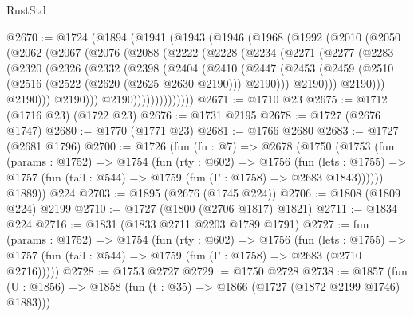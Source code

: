 \begin{lexlean}{RustStd}
\begin{coremodule}
@2670 := @1724
    (@1894
      (@1941
        (@1943
          (@1946
            (@1968
              (@1992
                (@2010
                  (@2050
                    (@2062
                      (@2067
                        (@2076
                          (@2088
                            (@2222
                              (@2228
                                (@2234
                                  (@2271
                                    (@2277
                                      (@2283
                                        (@2320
                                          (@2326
                                            (@2332
                                              (@2398
                                                (@2404
                                                  (@2410
                                                    (@2447
                                                      (@2453
                                                        (@2459
                                                          (@2510
                                                            (@2516
                                                              (@2522 (@2620 (@2625 @2630 @2190)))
                                                              @2190)))
                                                        @2190)))
                                                  @2190)))
                                            @2190)))
                                      @2190)))
                                @2190))))))))))))))
@2671 := @1710 @23
@2675 := @1712 (@1716 @23) (@1722 @23)
@2676 := @1731 @2195
@2678 := @1727 (@2676 @1747)
@2680 := @1770 (@1771 @23)
@2681 := @1766 @2680
@2683 := @1727 (@2681 @1796)
@2700 := @1726
    (fun (fn : @7) =>
    @2678
      (@1750
        (@1753
          (fun (params : @1752) =>
          @1754
            (fun (rty : @602) =>
            @1756
              (fun (lets : @1755) =>
              @1757 (fun (tail : @544) => @1759 (fun (Γ : @1758) => @2683 @1843))))))
        @1889))
    @224
@2703 := @1895 (@2676 (@1745 @224))
@2706 := @1808 (@1809 @224) @2199
@2710 := @1727 (@1800 (@2706 @1817) @1821)
@2711 := @1834 @224
@2716 := @1831 (@1833 @2711 @2203 @1789 @1791)
@2727 := fun (params : @1752) =>
  @1754
    (fun (rty : @602) =>
    @1756
      (fun (lets : @1755) =>
      @1757 (fun (tail : @544) => @1759 (fun (Γ : @1758) => @2683 (@2710 @2716)))))
@2728 := @1753 @2727
@2729 := @1750 @2728
@2738 := @1857 (fun (U : @1856) => @1858 (fun (t : @35) => @1866 (@1727 (@1872 @2199 @1746) @1883)))

\end{coremodule}
\end{lexlean}
